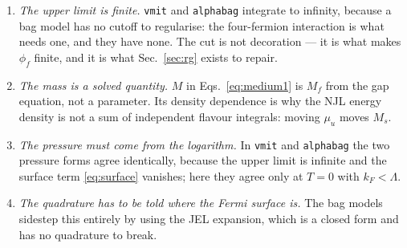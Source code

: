 \documentclass[aps,prc,onecolumn,superscriptaddress,nofootinbib,10pt]{revtex4-2}
\newcommand{\Lam}{\Lambda}
\begin{document}
\begin{enumerate}
\item \emph{The upper limit is finite.} \texttt{vmit} and \texttt{alphabag}
  integrate to infinity, because a bag model has no cutoff to regularise: the
  four-fermion interaction is what needs one, and they have none. The cut is
  not decoration --- it is what makes $\phi_f$ finite, and it is what
  Sec.~\ref{sec:rg} exists to repair.
\item \emph{The mass is a solved quantity.} $M$ in Eqs.~\eqref{eq:medium1} is
  $M_f$ from the gap equation, not a parameter. Its density dependence is why
  the NJL energy density is not a sum of independent flavour integrals: moving
  $\mu_u$ moves $M_s$.
\item \emph{The pressure must come from the logarithm.} In \texttt{vmit} and
  \texttt{alphabag} the two pressure forms agree identically, because the upper
  limit is infinite and the surface term \eqref{eq:surface} vanishes; here they
  agree only at $T=0$ with $k_F < \Lam$.
\item \emph{The quadrature has to be told where the Fermi surface is.} The bag
  models sidestep this entirely by using the JEL expansion, which is a closed
  form and has no quadrature to break.
\end{enumerate}
\end{document}
